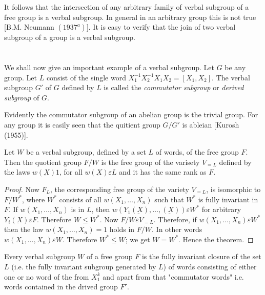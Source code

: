 It follows that the intersection of any arbitrary family of verbal
subgroup of a free group is a verbal subgroup. In general in an
arbitrary group this is not true [B.M. Neumann $(1937^a)$]. It is easy
to verify that the join of two verbal subgroup of a group is a verbal
subgroup. 

\section{}%

We shall now give an important example of a verbal subgroup. Let $G$ be
any group. Let $L$ consist of the single word $X^{-1}_1 X^{-1}_2 X_1
X_2 = [X_1, X_2]$. The verbal subgroup $G'$ of $G$ defined by $L$ is
called the \textit{commutator subgroup} or \textit{derived subgroup}
of $G$. 
  
Evidently the commutator subgroup of an abelian group is the trivial
group. For any group it is easily seen that the quitient group $G/G'$
is ableian [Kurosh (1955)]. 
  
\begin{Theorem}%
  Let $W$ be a verbal subgroup, defined by a set $L$ of words, of the
  free group $F$. Then the quotient group $F/W$ is the free group of
  the varisety $V_{=L}$ defined by the laws $w(\underbar{X})1$, for
  all $w(\underbar{X}) \varepsilon L$ and it has the same rank as
  $F$. 
\end{Theorem}  
  
\begin{proof}
  Now $F_L$, the corresponding free group of the variety $V_{=L}$, is
  isomorphic to $F/W^*$, where $W^*$ consists of all $w(X_1, \ldots,
  X_n)$ such that $W^*$ is fully invariant in $F$. If $w(X_1,\ldots,
  X_n)$ is in $L$, then $w(Y_1(\underbar{X}), \ldots,(\underbar{X}))
  \varepsilon W^*$ for arbitrary $Y_i (\underbar{X}) \varepsilon
  F$. Therefore $W \leq W^*$. Now $F/W \varepsilon V_{=L}$. Therefore,
  if $w(X_1, \ldots, X_n) \varepsilon W^*$ then the law $w(X_1,\ldots
 ,  X_n)=1$ holds in $F/W$. In other words $w(X_1,\ldots,X_n)
  \varepsilon W$. Therefore $W^* \leq W$; we get $W = W^*$. Hence the
  theorem. 
\end{proof}  
  
\begin{Theorem}%
  Every verbal subgroup $W$ of a free group $F$ is the fully invariant
  closure of the set $L$ (i.e. the fully invariant subgroup generated
  by $L$) of words consisting of either one or no word of the from
  $X^k_1$ and apart from that "commutator words" i.e. words contained
  in the drived group $F'$. 
\end{Theorem}  
  
